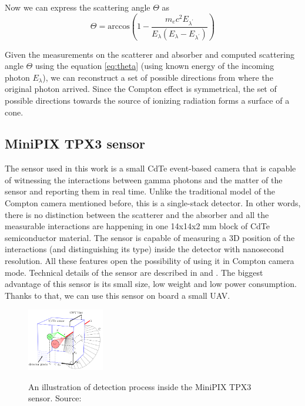 Now we can express the scattering angle $\Theta$ as
\begin{equation}
    \Theta = \mathrm{arccos} \left (  1-\frac{m_{e}c^{2}E_{\lambda^{\prime}}}{E_{\lambda} (E_{\lambda} - E_{\lambda^{\prime}})} \right )
    \label{eq:theta}
\end{equation}

Given the measurements on the scatterer and absorber and computed scattering angle $\Theta$ using the equation \ref{eq:theta} (using known energy of the incoming photon $E_{\lambda}$), we can reconstruct a set of possible directions from where the original photon arrived. Since the Compton effect is symmetrical, the set of possible directions towards the source of ionizing radiation forms a surface of a cone.

\subsection{MiniPIX TPX3 sensor}
The sensor used in this work is a small CdTe event-based camera that is capable of witnessing the interactions between gamma photons and the matter of the sensor and reporting them in real time.
Unlike the traditional model of the Compton camera mentioned before, this is a single-stack detector.
In other words, there is no distinction between the scatterer and the absorber and all the measurable interactions are happening in one 14x14x2 mm block of CdTe semiconductor material.
The sensor is capable of measuring a 3D position of the interactions (and distinguishing its type) inside the detector with nanosecond resolution. 
All these features open the possibility of using it in Compton camera mode.
Technical details of the sensor are described in \cite{baca2021gamma} and \cite{baca2019timepix}.
The biggest advantage of this sensor is its small size, low weight and low power consumption.
Thanks to that, we can use this sensor on board a small UAV. 

\begin{figure}[!h]
    \centering
    \includegraphics[width=0.3\textwidth]{./fig/photos/minipix.png}
    \label{fig:minipix}
    \caption{An illustration of detection process inside the MiniPIX TPX3 sensor. Source: \cite{baca2021gamma}}
\end{figure}

